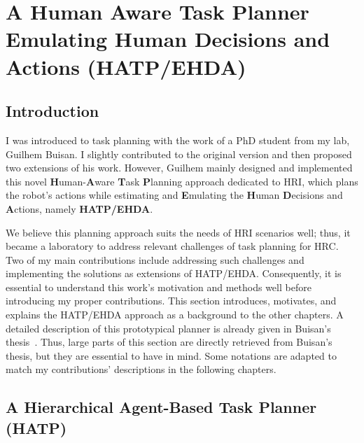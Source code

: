 \ifdefined{}
\else
\setcounter{chapter}{1} %
\dominitoc
\faketableofcontents
\fi

\chapter{A Human Aware Task Planner Emulating Human Decisions and Actions (HATP/EHDA)}
\label{chap:2}
\minitoc


\section{Introduction}

I was introduced to task planning with the work of a PhD student from my lab, Guilhem Buisan. I slightly contributed to the original version and then proposed two extensions of his work. However, Guilhem mainly designed and implemented this novel \textbf{H}uman-\textbf{A}ware \textbf{T}ask \textbf{P}lanning approach dedicated to HRI, which plans the robot's actions while estimating and \textbf{E}mulating the \textbf{H}uman \textbf{D}ecisions and \textbf{A}ctions, namely \textbf{HATP/EHDA}. 

We believe this planning approach suits the needs of HRI scenarios well; thus, it became a laboratory to address relevant challenges of task planning for HRC. 
Two of my main contributions include addressing such challenges and implementing the solutions as extensions of HATP/EHDA.   
Consequently, it is essential to understand this work's motivation and methods well before introducing my proper contributions. This section introduces, motivates, and explains the HATP/EHDA approach as a background to the other chapters. 
A detailed description of this prototypical planner is already given in Buisan's thesis~\cite{thesisBuisan21}. Thus, large parts of this section are directly retrieved from Buisan's thesis, but they are essential to have in mind. Some notations are adapted to match my contributions' descriptions in the following chapters. 

\section{A Hierarchical Agent-Based Task Planner (HATP)}

